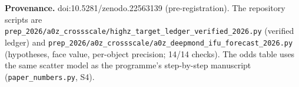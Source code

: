 \documentclass[11pt,letterpaper]{article}
\begin{document}
\medskip\small\textbf{Provenance.} doi:10.5281/zenodo.22563139 (pre-registration). The repository scripts are
\texttt{prep\_2026/a0z\_crossscale/highz\_target\_ledger\_verified\_2026.py} (verified ledger) and
\texttt{prep\_2026/a0z\_crossscale/a0z\_deepmond\_ifu\_forecast\_2026.py} (hypotheses, face value, per-object
precision; 14/14 checks). The odds table uses the same scatter model as the programme's step-by-step
manuscript (\texttt{paper\_numbers.py}, S4).
\end{document}
